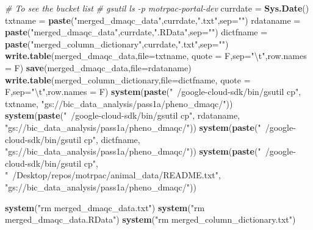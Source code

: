 \documentclass[]{article}
\newenvironment{Shaded}{\begin{snugshade}}{\end{snugshade}}
\newcommand{\KeywordTok}[1]{\textcolor[rgb]{0.13,0.29,0.53}{\textbf{#1}}}
\newcommand{\DataTypeTok}[1]{\textcolor[rgb]{0.13,0.29,0.53}{#1}}
\newcommand{\CharTok}[1]{\textcolor[rgb]{0.31,0.60,0.02}{#1}}
\newcommand{\StringTok}[1]{\textcolor[rgb]{0.31,0.60,0.02}{#1}}
\newcommand{\CommentTok}[1]{\textcolor[rgb]{0.56,0.35,0.01}{\textit{#1}}}
\newcommand{\NormalTok}[1]{#1}
\begin{document}
\begin{Shaded}
\begin{Highlighting}[]
\CommentTok{# To see the bucket list}
\CommentTok{# gsutil ls -p motrpac-portal-dev}
\NormalTok{currdate =}\StringTok{ }\KeywordTok{Sys.Date}\NormalTok{()}
\NormalTok{txtname =}\StringTok{ }\KeywordTok{paste}\NormalTok{(}\StringTok{"merged_dmaqc_data"}\NormalTok{,currdate,}\StringTok{".txt"}\NormalTok{,}\DataTypeTok{sep=}\StringTok{""}\NormalTok{)}
\NormalTok{rdataname =}\StringTok{ }\KeywordTok{paste}\NormalTok{(}\StringTok{"merged_dmaqc_data"}\NormalTok{,currdate,}\StringTok{".RData"}\NormalTok{,}\DataTypeTok{sep=}\StringTok{""}\NormalTok{)}
\NormalTok{dictfname =}\StringTok{ }\KeywordTok{paste}\NormalTok{(}\StringTok{"merged_column_dictionary"}\NormalTok{,currdate,}\StringTok{".txt"}\NormalTok{,}\DataTypeTok{sep=}\StringTok{""}\NormalTok{)}
\KeywordTok{write.table}\NormalTok{(merged_dmaqc_data,}\DataTypeTok{file=}\NormalTok{txtname,}
            \DataTypeTok{quote =}\NormalTok{ F,}\DataTypeTok{sep=}\StringTok{"}\CharTok{\textbackslash{}t}\StringTok{"}\NormalTok{,}\DataTypeTok{row.names =}\NormalTok{ F)}
\KeywordTok{save}\NormalTok{(merged_dmaqc_data,}\DataTypeTok{file=}\NormalTok{rdataname)}
\KeywordTok{write.table}\NormalTok{(merged_column_dictionary,}\DataTypeTok{file=}\NormalTok{dictfname,}
            \DataTypeTok{quote =}\NormalTok{ F,}\DataTypeTok{sep=}\StringTok{"}\CharTok{\textbackslash{}t}\StringTok{"}\NormalTok{,}\DataTypeTok{row.names =}\NormalTok{ F)}
\KeywordTok{system}\NormalTok{(}\KeywordTok{paste}\NormalTok{(}\StringTok{"~/google-cloud-sdk/bin/gsutil cp"}\NormalTok{, txtname,}
             \StringTok{"gs://bic_data_analysis/pass1a/pheno_dmaqc/"}\NormalTok{))}
\KeywordTok{system}\NormalTok{(}\KeywordTok{paste}\NormalTok{(}\StringTok{"~/google-cloud-sdk/bin/gsutil cp"}\NormalTok{, rdataname,}
             \StringTok{"gs://bic_data_analysis/pass1a/pheno_dmaqc/"}\NormalTok{))}
\KeywordTok{system}\NormalTok{(}\KeywordTok{paste}\NormalTok{(}\StringTok{"~/google-cloud-sdk/bin/gsutil cp"}\NormalTok{, dictfname,}
             \StringTok{"gs://bic_data_analysis/pass1a/pheno_dmaqc/"}\NormalTok{))}
\KeywordTok{system}\NormalTok{(}\KeywordTok{paste}\NormalTok{(}\StringTok{"~/google-cloud-sdk/bin/gsutil cp"}\NormalTok{, }
             \StringTok{"~/Desktop/repos/motrpac/animal_data/README.txt"}\NormalTok{,}
             \StringTok{"gs://bic_data_analysis/pass1a/pheno_dmaqc/"}\NormalTok{))}

\KeywordTok{system}\NormalTok{(}\StringTok{"rm merged_dmaqc_data.txt"}\NormalTok{)}
\KeywordTok{system}\NormalTok{(}\StringTok{"rm merged_dmaqc_data.RData"}\NormalTok{)}
\KeywordTok{system}\NormalTok{(}\StringTok{"rm merged_column_dictionary.txt"}\NormalTok{)}
\end{Highlighting}
\end{Shaded}
\end{document}
